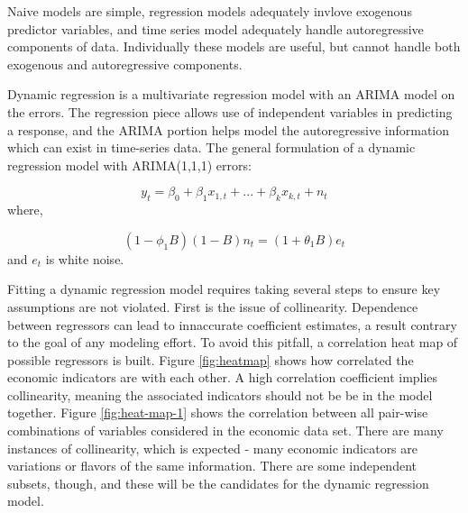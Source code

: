 \documentclass[12pt,letterpaper,toc=flat,oneside]{report}
\theoremstyle{definition}
\theoremstyle{definition}
\theoremstyle{definition}
\theoremstyle{remark}
\begin{document}
Naive models are simple, regression models adequately invlove exogenous
predictor variables, and time series model adequately handle
autoregressive components of data. Individually these models are useful,
but cannot handle both exogenous and autoregressive components.

Dynamic regression is a multivariate regression model with an ARIMA
model on the errors. The regression piece allows use of independent
variables in predicting a response, and the ARIMA portion helps model
the autoregressive information which can exist in time-series data. The
general formulation of a dynamic regression model with ARIMA(1,1,1)
errors:

\[ y_t = \beta_0 + \beta_1x_{1,t} + ... + \beta_kx_{k,t} + n_t\] where,

\[ (1-\phi_1B)(1-B)n_t = (1+\theta_1B)e_t \] and \(e_t\) is white noise.

Fitting a dynamic regression model requires taking several steps to
ensure key assumptions are not violated. First is the issue of
collinearity. Dependence between regressors can lead to innaccurate
coefficient estimates, a result contrary to the goal of any modeling
effort. To avoid this pitfall, a correlation heat map of possible
regressors is built. Figure \ref{fig:heatmap} shows how correlated the
economic indicators are with each other. A high correlation coefficient
implies collinearity, meaning the associated indicators should not be be
in the model together. Figure \ref{fig:heat-map-1} shows the correlation
between all pair-wise combinations of variables considered in the
economic data set. There are many instances of collinearity, which is
expected - many economic indicators are variations or flavors of the
same information. There are some independent subsets, though, and these
will be the candidates for the dynamic regression model.
\end{document}
